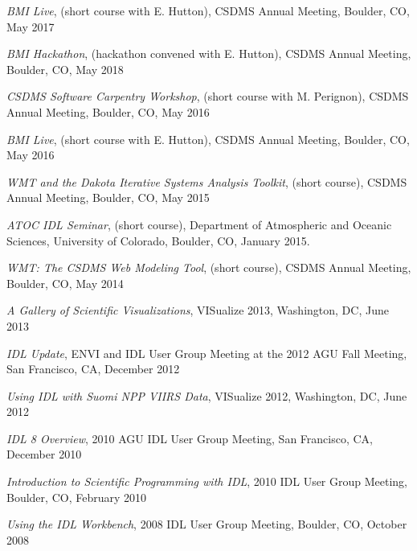 \begin{enumerate}[{[}1{]}]
  \item \textit{BMI Live}, (short course with E. Hutton),
    CSDMS Annual Meeting, Boulder, CO, May 2017

  \item \textit{BMI Hackathon}, (hackathon convened with E. Hutton),
    CSDMS Annual Meeting, Boulder, CO, May 2018

  \item \textit{CSDMS Software Carpentry Workshop}, (short course with
    M. Perignon), CSDMS Annual Meeting, Boulder, CO, May 2016

  \item \textit{BMI Live}, (short course with E. Hutton),
    CSDMS Annual Meeting, Boulder, CO, May 2016

  \item \textit{WMT and the Dakota Iterative Systems Analysis Toolkit},
    (short course), CSDMS Annual Meeting, Boulder, CO, May 2015

  \item \textit{ATOC IDL Seminar}, (short course), Department of
    Atmospheric and Oceanic Sciences, University of Colorado, Boulder,
    CO, January 2015.

  \item \textit{WMT: The CSDMS Web Modeling Tool}, (short course), CSDMS
    Annual Meeting, Boulder, CO, May 2014

  \item \textit{A Gallery of Scientific Visualizations}, {VISualize} 2013,
    Washington, DC, June 2013

  \item \textit{IDL Update}, ENVI and IDL User Group Meeting at the 2012
    AGU Fall Meeting, San Francisco, CA, December 2012

  \item \textit{Using IDL with Suomi NPP VIIRS Data}, {VISualize} 2012,
    Washington, DC, June 2012

  \item \textit{IDL 8 Overview}, 2010 AGU IDL User Group Meeting, San
    Francisco, CA, December 2010

  \item \textit{Introduction to Scientific Programming with IDL}, 2010 IDL
    User Group Meeting, Boulder, CO, February 2010

  \item \textit{Using the IDL Workbench}, 2008 IDL User Group Meeting,
    Boulder, CO, October 2008

\end{enumerate}
